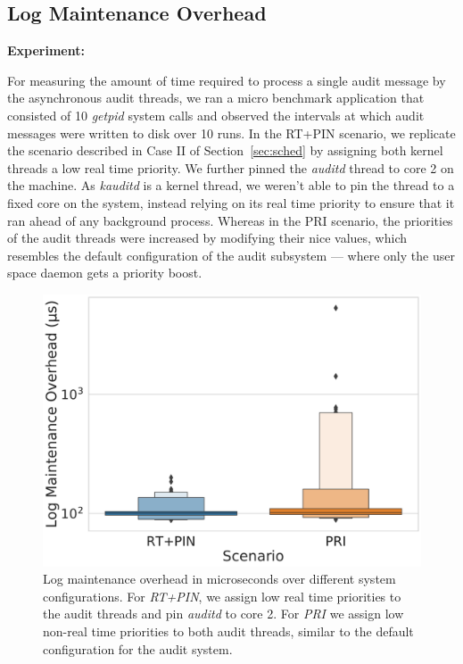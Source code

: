 \subsection{Log Maintenance Overhead}
\textbf{Experiment:}


For measuring the amount of time required to process a single audit message by the asynchronous audit threads, we ran a micro benchmark application that consisted of 10 \textit{getpid} system calls and observed the intervals at which audit messages were written to disk over 10 runs. In the RT+PIN scenario, we replicate the scenario described in Case II of Section~\ref{sec:sched} by assigning both kernel threads a low real time priority. We further pinned the \textit{auditd} thread to core 2 on the machine. As \textit{kauditd} is a kernel thread, we weren't able to pin the thread to a fixed core on the system, instead relying on its real time priority to ensure that it ran ahead of any background process. Whereas in the PRI scenario, the priorities of the audit threads were increased by modifying their nice values, which resembles the default configuration of the audit subsystem — where only the user space daemon gets a priority boost.

\begin{figure}[t!]
    \centering
    \includegraphics[width=0.9\linewidth,keepaspectratio,scale=0.9]{fig/Throughput.pdf}
    \caption{\label{fig:eval_throughput}Log maintenance overhead in microseconds over different system configurations. For \textit{RT+PIN}, we assign low real time priorities to the audit threads and pin \textit{auditd} to core 2. For \textit{PRI} we assign low non-real time priorities to both audit threads, similar to the default configuration for the audit system.}
\end{figure}

